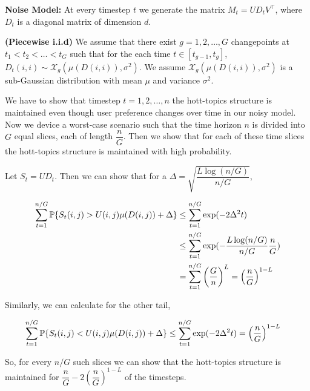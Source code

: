 	\textbf{Noise Model:} At every timestep $t$ we generate the matrix $M_{t} = UD_t V^{\intercal}$, where $D_t$ is a diagonal matrix of dimension $d$.

\begin{assumption} \textbf{(Piecewise i.i.d)} We assume that there exist $g = 1,2,\ldots,G$ changepoints at $t_1 < t_2 < \ldots < t_G$ such that for the each time $t\in [t_{g-1}, t_g]$, $D_t(i,i)\sim \mathcal{X}_g (\mu(D(i,i)),\sigma^2)$. We assume $\mathcal{X}_g (\mu(D(i,i)),\sigma^2)$ is a sub-Gaussian distribution with mean $\mu$ and variance $\sigma^2$.
\end{assumption}

We have to show that timestep $t=1,2,\ldots,n$ the hott-topics structure is maintained even though user preference changes over time in our noisy model. Now we device a worst-case scenario such that the time horizon $n$ is divided into $G$ equal slices, each of length $\dfrac{n}{G}$. Then we show that for each of these time slices the hott-topics structure is maintained with high probability.


Let $S_t = UD_t$. Then we can show that for a $\Delta = \sqrt{\dfrac{L\log(n/G)}{n/G}}$,

\begin{align*}
\sum_{t=1}^{n/G}\mathbb{P}\lbrace  S_t(i,j) > U(i,j) \mu(D(i,j)) + \Delta\rbrace &\leq \sum_{t=1}^{n/G}\exp(-2\Delta^2 t)\\
& \leq \sum_{t=1}^{n/G}\exp(-\dfrac{L\log(n/G)}{n/G}\dfrac{n}{G})\\
& = \sum_{t=1}^{n/G}\left(\dfrac{G}{n}\right)^L =\left(\dfrac{n}{G}\right)^{1-L}
\end{align*}

Similarly, we can calculate for the other tail, 

\begin{align*}
\sum_{t=1}^{n/G}\mathbb{P}\lbrace  S_t(i,j) < U(i,j) \mu(D(i,j)) + \Delta\rbrace &\leq \sum_{t=1}^{n/G}\exp(-2\Delta^2 t) = \left(\dfrac{n}{G}\right)^{1-L}
\end{align*}

So, for every $n/G$ such slices we can show that the hott-topics structure is maintained for $\dfrac{n}{G} - 2\left(\dfrac{n}{G}\right)^{1-L}$ of the timesteps.



%
%
%
%
%





